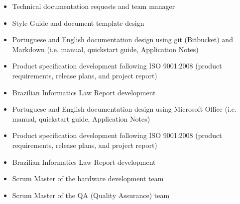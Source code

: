 \documentclass[10pt,a4paper,ragged2e]{altacv}
\begin{document}

\begin{fullwidth}
\makecvheader
\end{fullwidth}



  \begin{itemize}
    \item Technical documentation requests and team manager
    \item Style Guide and document template design
    \item Portuguese and English documentation design using git (Bitbucket) and Markdown (i.e. manual, quickstart guide, Application Notes)
    \item Product specification development following ISO 9001:2008 (product requirements, release plans, and project report)
    \item Brazilian Informatics Law Report development
  \end{itemize}
  \divider

  \begin{itemize}
    \item Portuguese and English documentation design using Microsoft Office (i.e. manual, quickstart guide, Application Notes)
    \item Product specification development following ISO 9001:2008 (product requirements, release plans, and project report)
    \item Brazilian Informatics Law Report development
    \item Scrum Master of the hardware development team
    \item Scrum Master of the QA (Quality Assurance) team
  \end{itemize}
  \divider
\end{document}
